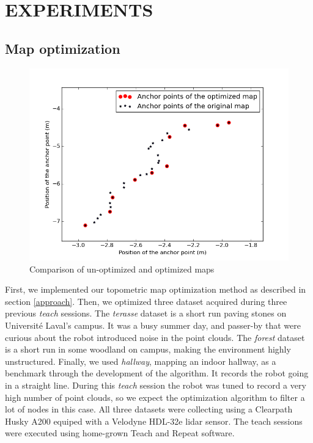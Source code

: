 \documentclass[letterpaper,10 pt,conference]{ieeeconf}
\begin{document}
\section{EXPERIMENTS}

\subsection{Map optimization}

\begin{figure}
  \centering
  \includegraphics[scale=0.4]{map_optimization}
  \caption{Comparison of un-optimized and optimized maps}
\end{figure}

First, we implemented our topometric map optimization method as described in section \ref{approach}.
Then, we optimized three dataset acquired during three previous \textit{teach} sessions. The
\textit{terasse} dataset is a short run paving stones on Université Laval's campus. It was a busy
summer day, and passer-by that were curious about the robot introduced noise in the point
clouds. The \textit{forest} dataset is a short run in some woodland on campus, making the environment
highly unstructured. Finally, we used \textit{hallway}, mapping an indoor hallway, as a
benchmark through the development of the algorithm. It records the robot going in a straight line.
During this \textit{teach} session the robot was tuned to record a very high number of point clouds,
so we expect the optimization algorithm to filter a lot of nodes in this case. All three datasets
were collecting using a Clearpath Husky A200 equiped with a Velodyne HDL-32e lidar sensor. The teach
sessions were executed using home-grown Teach and Repeat software.
\end{document}
